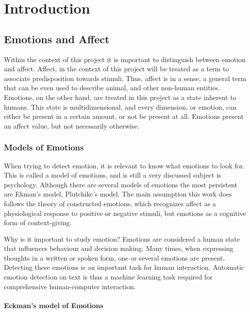 \chapter{Introduction}\label{chap:Introduction}

\section{Emotions and Affect}\label{sec:Emotions and Affect}

Within the context of this project it is important to distinguish between emotion and affect. Affect, in the context of this project will be treated as a term to associate predisposition towards stimuli. Thus, affect is in a sense, a general term that can be even used to describe animal, and other non-human entities. Emotions, on the other hand, are treated in this project as a state inherent to humans. This state is multidimensional, and every dimension, or emotion, can either be present in a certain amount, or not be present at all.
Emotions present an affect value, but not necessarily otherwise.

\subsection{Models of Emotions}\label{sub:Models of Emotions}

When trying to detect emotion, it is relevant to know what emotions to look for. This is called a model of emotions, and is still a very discussed subject is psychology. Although there are several models of emotions the most persistent are Ekman’s model, Plutchikc’s model. The main assumption this work does follows the theory of constructed emotions, which recognizes affect as a physiological response to positive or negative stimuli, but emotions as a cognitive form of context-giving.

Why is it important to study emotion?
Emotions are considered a human state that influences behaviour and decision making. Many times, when expressing thoughts in a written or spoken form, one or several emotions are present. Detecting these emotions is an important task for human interaction. Automatic emotion detection on text is thus a machine learning task required for comprehensive human-computer interaction.

\subsubsection{Eckman's model of Emotions}\label{subs:Eckman's model of Emotions}

